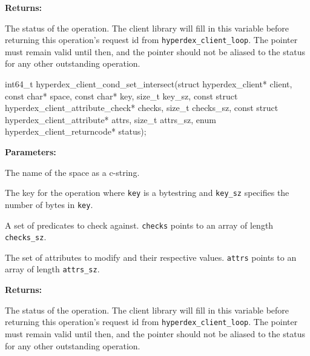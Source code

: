 \noindent\textbf{Returns:}
\begin{description}[labelindent=\widthof{{\texttt{status}}},leftmargin=*,noitemsep,nolistsep,align=right]
\item[\texttt{status}] The status of the operation.  The client library will fill in this variable before returning this operation's request id from \texttt{hyperdex\_client\_loop}.  The pointer must remain valid until then, and the pointer should not be aliased to the status for any other outstanding operation.
\end{description}

\funcsep
\begin{ccode}
int64_t hyperdex_client_cond_set_intersect(struct hyperdex_client* client,
                const char* space,
                const char* key, size_t key_sz,
                const struct hyperdex_client_attribute_check* checks, size_t checks_sz,
                const struct hyperdex_client_attribute* attrs, size_t attrs_sz,
                enum hyperdex_client_returncode* status);
\end{ccode}
\funcdesc 

\noindent\textbf{Parameters:}
\begin{description}[labelindent=\widthof{{\texttt{checks}, \texttt{checks\_sz}}},leftmargin=*,noitemsep,nolistsep,align=right]
\item[\texttt{space}] The name of the space as a c-string.
\item[\texttt{key}, \texttt{key\_sz}] The key for the operation where \texttt{key} is a bytestring and \texttt{key\_sz} specifies the number of bytes in \texttt{key}.
\item[\texttt{checks}, \texttt{checks\_sz}] A set of predicates to check against.  \texttt{checks} points to an array of length \texttt{checks\_sz}.
\item[\texttt{attrs}, \texttt{attrs\_sz}] The set of attributes to modify and their respective values.  \texttt{attrs} points to an array of length \texttt{attrs\_sz}.
\end{description}

\noindent\textbf{Returns:}
\begin{description}[labelindent=\widthof{{\texttt{status}}},leftmargin=*,noitemsep,nolistsep,align=right]
\item[\texttt{status}] The status of the operation.  The client library will fill in this variable before returning this operation's request id from \texttt{hyperdex\_client\_loop}.  The pointer must remain valid until then, and the pointer should not be aliased to the status for any other outstanding operation.
\end{description}

